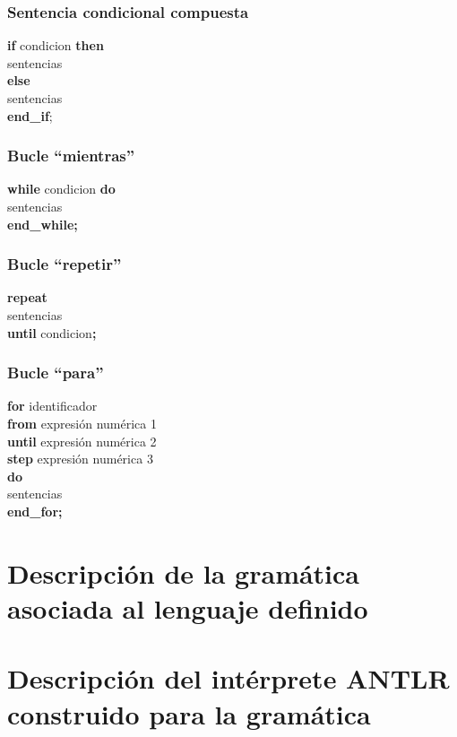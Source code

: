 \documentclass[a4paper,12pt,twoside,openright]{report}
\begin{document}
    \subsection{Sentencia condicional compuesta}
    \textbf{if} condicion \textbf{then}\\
      sentencias\\
    \textbf{else}\\
      sentencias\\
    \textbf{end\_if};
    \subsection{Bucle ``mientras''}
    \textbf{while} condicion \textbf{do}\\
      sentencias\\
    \textbf{end\_while;}\\
    \subsection{Bucle ``repetir''}
    \textbf{repeat}\\ 
    sentencias\\
    \textbf{until} condicion\textbf{;}\\
    
    \subsection{Bucle ``para''}
    \textbf{for} identificador\\
      \textbf{from} expresión numérica 1\\
      \textbf{until} expresión numérica 2\\
      \textbf{step} expresión numérica 3\\
    \textbf{do}\\
      sentencias\\
    \textbf{end\_for;}\\
  
  
  \chapter{Descripción de la gramática asociada al lenguaje definido \label{defgra}}

\chapter{Descripción del intérprete ANTLR construido para la gramática \label{defantlr}}
\end{document}
